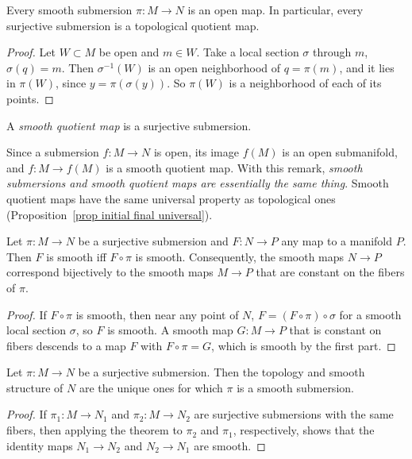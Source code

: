 \begin{prop}\label{thm submersions are open quotient maps}
    Every smooth submersion $\pi:M\to N$ is an open map. In particular, every surjective submersion is a topological quotient map.
\end{prop}
\begin{proof}
    Let $W\subset M$ be open and $m\in W$. Take a local section $\sigma$ through $m$, $\sigma(q)=m$. Then $\sigma^{-1}(W)$ is an open neighborhood of $q=\pi(m)$, and it lies in $\pi(W)$, since $y=\pi(\sigma(y))$. So $\pi(W)$ is a neighborhood of each of its points.
\end{proof}

\begin{defn}
    A \emph{smooth quotient map} is a surjective submersion.
\end{defn}
Since a submersion $f:M\to N$ is open, its image $f(M)$ is an open submanifold, and $f:M\to f(M)$ is a smooth quotient map. With this remark, \emph{smooth submersions and smooth quotient maps are essentially the same thing}. Smooth quotient maps have the same universal property as topological ones (Proposition~\ref{prop initial final universal}).

\begin{thm}\label{thm characteristic property submersions}
    Let $\pi:M\to N$ be a surjective submersion and $F:N\to P$ any map to a manifold $P$. Then $F$ is smooth iff $F\circ\pi$ is smooth. Consequently, the smooth maps $N\to P$ correspond bijectively to the smooth maps $M\to P$ that are constant on the fibers of $\pi$.
\end{thm}
\begin{proof}
    If $F\circ\pi$ is smooth, then near any point of $N$, $F=(F\circ\pi)\circ\sigma$ for a smooth local section $\sigma$, so $F$ is smooth. A smooth map $G:M\to P$ that is constant on fibers descends to a map $F$ with $F\circ\pi=G$, which is smooth by the first part.
\end{proof}

\begin{cor}
    Let $\pi:M\to N$ be a surjective submersion. Then the topology and smooth structure of $N$ are the unique ones for which $\pi$ is a smooth submersion.
\end{cor}
\begin{proof}
    If $\pi_1:M\to N_1$ and $\pi_2:M\to N_2$ are surjective submersions with the same fibers, then applying the theorem to $\pi_2$ and $\pi_1$, respectively, shows that the identity maps $N_1\to N_2$ and $N_2\to N_1$ are smooth.
\end{proof}

